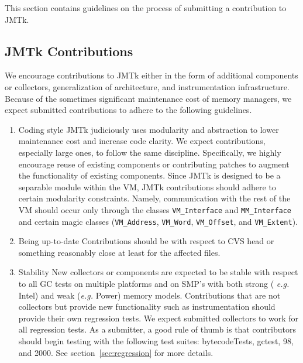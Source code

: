 This section contains guidelines on the process of
submitting a contribution to JMTk.


\subsection{JMTk Contributions}

We encourage contributions to JMTk either in the form of additional
components or collectors, generalization of architecture,
and instrumentation infrastructure.  Because of the sometimes significant
maintenance cost of memory managers, we expect submitted contributions
to adhere to the following guidelines.


\begin{enumerate}

\item{Coding style}  
JMTk judiciously uses modularity and abstraction to lower maintenance
cost and increase code clarity.  We expect contributions, especially
large ones, to follow the same discipline.  Specifically, we highly
encourage reuse of existing components or contributing patches to
augment the functionality of existing components.  Since JMTk is
designed to be a separable module within the VM, JMTk contributions
should adhere to certain modularity constraints.  Namely,
communication with the rest of the VM should occur only through the
classes {\tt VM\_Interface} and {\tt MM\_Interface} and certain magic classes
({\tt VM\_Address}, {\tt VM\_Word}, {\tt VM\_Offset}, and {\tt VM\_Extent}).

\item{Being up-to-date}  
Contributions should be with respect to CVS head or something
reasonably close at least for the affected files.

\item{Stability}  
New collectors or components are expected to be stable with respect to
all GC tests on multiple platforms and on SMP's with both strong ({\it
e.g.} Intel) and weak ({\it e.g.} Power) memory models.  Contributions
that are not collectors but provide new functionality such as
instrumentation should provide their own regression tests.
We expect submitted collectors to work for all regression tests.
As a submitter, a good rule of thumb is that contributors should begin
testing with the following test suites: bytecodeTests, gctest, 
\SPECjvmR{}98, and \SPECjbbR{}2000.  See section~\ref{sec:regression}
for more details.


\end{enumerate}
